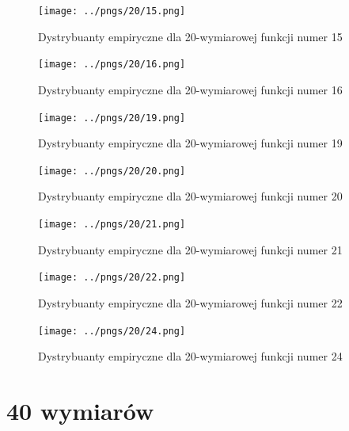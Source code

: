 \documentclass[a4paper,onecolumn,oneside,12pt,wide,floatssmall]{mwrep}
\theoremstyle{definition}
\theoremstyle{plain}%
\theoremstyle{remark}
\begin{document}
\begin{figure}[H]
\centering
\texttt{[image: ../pngs/20/15.png]}
\caption{Dystrybuanty empiryczne dla 20-wymiarowej funkcji numer 15}
\end{figure}

\begin{figure}[H]
\centering
\texttt{[image: ../pngs/20/16.png]} 
\caption{Dystrybuanty empiryczne dla 20-wymiarowej funkcji numer 16}
\end{figure}

\begin{figure}[H]
\centering
\texttt{[image: ../pngs/20/19.png]}
\caption{Dystrybuanty empiryczne dla 20-wymiarowej funkcji numer 19}
\end{figure}

\begin{figure}[H]
\centering
\texttt{[image: ../pngs/20/20.png]}
\caption{Dystrybuanty empiryczne dla 20-wymiarowej funkcji numer 20}
\end{figure}

\begin{figure}[H]
\centering
\texttt{[image: ../pngs/20/21.png]}
\caption{Dystrybuanty empiryczne dla 20-wymiarowej funkcji numer 21}
\end{figure}

\begin{figure}[H]
\centering
\texttt{[image: ../pngs/20/22.png]}
\caption{Dystrybuanty empiryczne dla 20-wymiarowej funkcji numer 22}
\end{figure}

\begin{figure}[H]
\centering
\texttt{[image: ../pngs/20/24.png]}
\caption{Dystrybuanty empiryczne dla 20-wymiarowej funkcji numer 24}
\end{figure}

\section{40 wymiarów}
\end{document}
